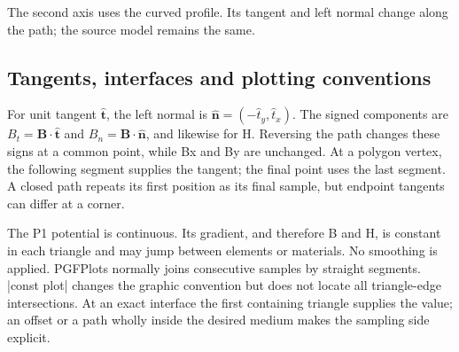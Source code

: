 The second axis uses the curved profile. Its tangent and left normal change along the path; the source model remains the same.
\begin{codeexample}[width=0pt]
\end{codeexample}


\subsection{Tangents, interfaces and plotting conventions}
For unit tangent $\hat{\mathbf t}$, the left normal is
$\hat{\mathbf n}=(-\hat t_y,\hat t_x)$.
The signed components are $B_t=\mathbf B\cdot\hat{\mathbf t}$ and
$B_n=\mathbf B\cdot\hat{\mathbf n}$, and likewise for H. Reversing the
path changes these signs at a common point, while Bx and By are unchanged.
At a polygon vertex, the following segment supplies the tangent; the
final point uses the last segment. A closed path repeats its first
position as its final sample, but endpoint tangents can differ at a corner.

The P1 potential is continuous. Its gradient, and therefore B and H,
is constant in each triangle and may jump between elements or materials.
No smoothing is applied. PGFPlots normally joins consecutive samples by
straight segments. |const plot| changes the graphic convention but does
not locate all triangle-edge intersections. At an exact interface the
first containing triangle supplies the value; an offset or a path wholly
inside the desired medium makes the sampling side explicit.
